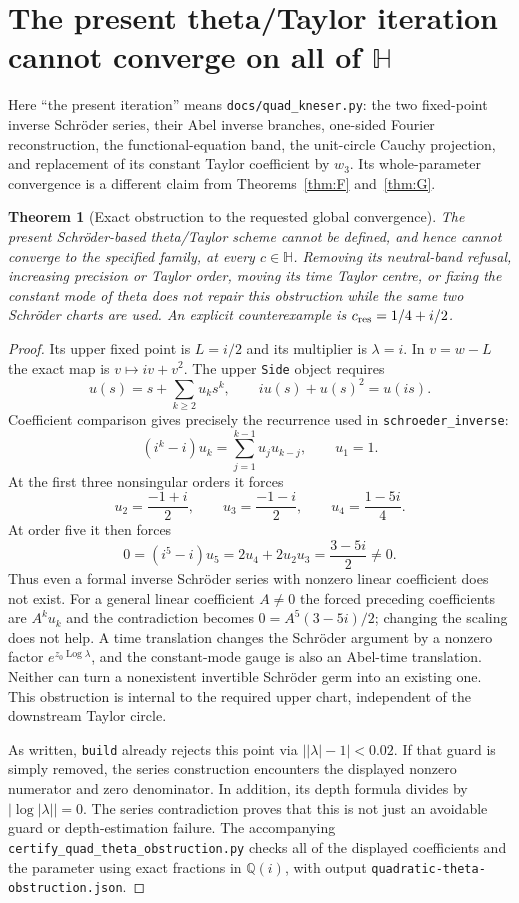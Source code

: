 \documentclass[11pt]{article}
\newtheorem{theorem}{Theorem}
\newcommand{\HH}{\mathbb H}
\newcommand{\Log}{\operatorname{Log}}
\begin{document}
\section{The present theta/Taylor iteration cannot converge on all of $\HH$}
\label{sec:numerical-obstruction}
Here ``the present iteration'' means \texttt{docs/quad\_kneser.py}:
the two fixed-point inverse Schr\"oder series, their Abel inverse branches,
one-sided Fourier reconstruction, the functional-equation band, the
unit-circle Cauchy projection, and replacement of its constant Taylor
coefficient by $w_3$. Its whole-parameter convergence is a different
claim from Theorems~\ref{thm:F} and~\ref{thm:G}.

\begin{theorem}[Exact obstruction to the requested global convergence]
\label{thm:theta-no-global}
The present Schr\"oder-based theta/Taylor scheme cannot be defined, and
hence cannot converge to the specified family, at every $c\in\HH$.
Removing its neutral-band refusal, increasing precision or Taylor order,
moving its time Taylor centre, or fixing the constant mode of theta does
not repair this obstruction while the same two Schr\"oder charts are used.
An explicit counterexample is $c_{\rm res}=1/4+i/2$.
\end{theorem}
\begin{proof}
Its upper fixed point is $L=i/2$ and its multiplier is $\lambda=i$.
In $v=w-L$ the exact map is $v\mapsto iv+v^2$.
The upper \texttt{Side} object requires
\[
 u(s)=s+\sum_{k\ge2}u_ks^k,\qquad
 iu(s)+u(s)^2=u(is).
\]
Coefficient comparison gives precisely the recurrence used in
\texttt{schroeder\_inverse}:
\[
 (i^k-i)u_k=\sum_{j=1}^{k-1}u_ju_{k-j},\qquad u_1=1.
\]
At the first three nonsingular orders it forces
\[
 u_2=\frac{-1+i}{2},\qquad
 u_3=\frac{-1-i}{2},\qquad
 u_4=\frac{1-5i}{4}.
\]
At order five it then forces
\[
 0=(i^5-i)u_5=2u_4+2u_2u_3=\frac{3-5i}{2}\ne0.
\]
Thus even a formal inverse Schr\"oder series with nonzero linear
coefficient does not exist. For a general linear coefficient $A\ne0$
the forced preceding coefficients are $A^ku_k$ and the contradiction
becomes $0=A^5(3-5i)/2$; changing the scaling does not help.
A time translation changes the Schr\"oder argument by a nonzero
factor $e^{z_0\Log\lambda}$, and the constant-mode gauge is also an
Abel-time translation. Neither can turn a nonexistent invertible
Schr\"oder germ into an existing one. This obstruction is internal to
the required upper chart, independent of the downstream Taylor circle.

As written, \texttt{build} already rejects this point via
$\bigl||\lambda|-1\bigr|<0.02$. If that guard is simply removed,
the series construction encounters the displayed nonzero numerator
and zero denominator. In addition, its depth formula divides by
$|\log|\lambda||=0$. The series contradiction proves that this is
not just an avoidable guard or depth-estimation failure.
The accompanying \texttt{certify\_quad\_theta\_obstruction.py} checks
all of the displayed coefficients and the parameter using exact
fractions in $\mathbb Q(i)$, with output
\texttt{quadratic-theta-obstruction.json}.
\end{proof}
\end{document}
